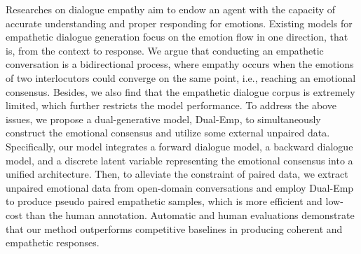 Researches on dialogue empathy aim to endow an agent with the capacity of accurate understanding and proper responding for emotions. Existing models for empathetic dialogue generation focus on the emotion flow in one direction, that is, from the context to response. We argue that conducting an empathetic conversation is a bidirectional process, where empathy occurs when the emotions of two interlocutors could converge on the same point, i.e., reaching an emotional consensus. Besides, we also find that the empathetic dialogue corpus is extremely limited, which further restricts the model performance. To address the above issues, we propose a dual-generative model, Dual-Emp, to simultaneously construct the emotional consensus and utilize some external unpaired data. Specifically, our model integrates a forward dialogue model, a backward dialogue model, and a discrete latent variable representing the emotional consensus into a unified architecture. Then, to alleviate the constraint of paired data, we extract unpaired emotional data from open-domain conversations and employ Dual-Emp to produce pseudo paired empathetic samples, which is more efficient and low-cost than the human annotation. Automatic and human evaluations demonstrate that our method outperforms competitive baselines in producing coherent and empathetic responses.
